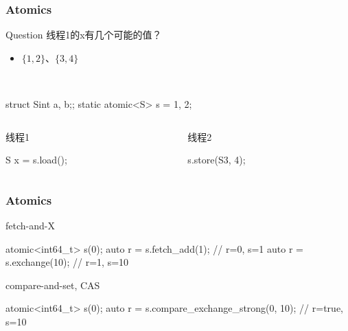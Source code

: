 \documentclass[UTF8,lualatex]{ctexbeamer}
\begin{document}
\begin{frame}[fragile,t]
    \frametitle{Atomics}
    \begin{alertblock}{Question}
        线程1的x有几个可能的值？
        \begin{itemize}
            \item $\{1,2\}$、$\{3,4\}$
        \end{itemize}
    \end{alertblock}
    \begin{exampleblock}{~}
        \begin{cppcode}
            struct S{int a, b;};
            static atomic<S> s = {1, 2};
        \end{cppcode}
    \end{exampleblock}
    \begin{columns}
        \begin{column}{.45\textwidth}
            \begin{exampleblock}{线程1}
                \begin{cppcode}
                    S x = s.load();
                \end{cppcode}
            \end{exampleblock}
        \end{column}
        \begin{column}{.45\textwidth}
            \begin{exampleblock}{线程2}
                \begin{cppcode}
                    s.store(S{3, 4});
                \end{cppcode}
            \end{exampleblock}
        \end{column}
    \end{columns}
\end{frame}


\begin{frame}[fragile,t]
    \frametitle{Atomics}
    \footnotesize
    \begin{block}{fetch-and-X}
        \begin{cppcode}
            atomic<int64_t> s(0);
            auto r = s.fetch_add(1);
            // r=0, s=1
            auto r = s.exchange(10);
            // r=1, s=10
        \end{cppcode}
    \end{block}
    \begin{block}{compare-and-set, CAS}
        \begin{cppcode}
            atomic<int64_t> s(0);
            auto r = s.compare_exchange_strong(0, 10);
            // r=true, s=10
        \end{cppcode}
    \end{block}
\end{frame}
\end{document}
